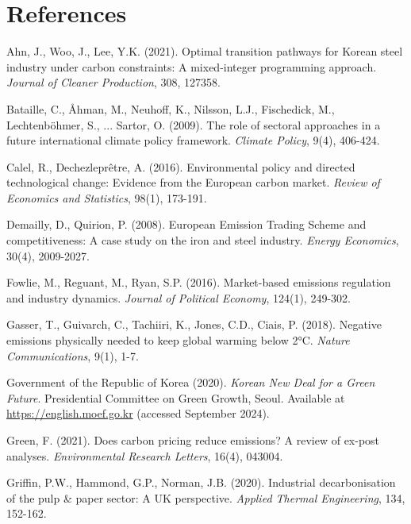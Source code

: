 \documentclass[preprint,1p,authoryear]{elsarticle}
\begin{document}
\section*{References}
\begin{thebibliography}{99}

 Ahn, J., Woo, J., Lee, Y.K. (2021). Optimal transition pathways for Korean steel industry under carbon constraints: A mixed-integer programming approach. \textit{Journal of Cleaner Production}, 308, 127358.

 Bataille, C., Åhman, M., Neuhoff, K., Nilsson, L.J., Fischedick, M., Lechtenböhmer, S., ... Sartor, O. (2009). The role of sectoral approaches in a future international climate policy framework. \textit{Climate Policy}, 9(4), 406-424.

 Calel, R., Dechezleprêtre, A. (2016). Environmental policy and directed technological change: Evidence from the European carbon market. \textit{Review of Economics and Statistics}, 98(1), 173-191.

 Demailly, D., Quirion, P. (2008). European Emission Trading Scheme and competitiveness: A case study on the iron and steel industry. \textit{Energy Economics}, 30(4), 2009-2027.

 Fowlie, M., Reguant, M., Ryan, S.P. (2016). Market-based emissions regulation and industry dynamics. \textit{Journal of Political Economy}, 124(1), 249-302.

 Gasser, T., Guivarch, C., Tachiiri, K., Jones, C.D., Ciais, P. (2018). Negative emissions physically needed to keep global warming below 2°C. \textit{Nature Communications}, 9(1), 1-7.

 Government of the Republic of Korea (2020). \textit{Korean New Deal for a Green Future}. Presidential Committee on Green Growth, Seoul. Available at \url{https://english.moef.go.kr} (accessed September 2024).

 Green, F. (2021). Does carbon pricing reduce emissions? A review of ex-post analyses. \textit{Environmental Research Letters}, 16(4), 043004.

 Griffin, P.W., Hammond, G.P., Norman, J.B. (2020). Industrial decarbonisation of the pulp \& paper sector: A UK perspective. \textit{Applied Thermal Engineering}, 134, 152-162.


\end{thebibliography}
\end{document}
